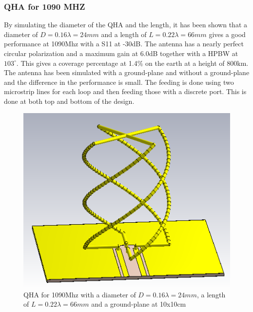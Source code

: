 \subsubsection{QHA for 1090 MHZ}
By simulating the diameter of the QHA and the length, it has been shown that a diameter of $D=0.16\lambda = 24mm$ and a length of $L=0.22\lambda = 66mm$ gives a good performance at 1090Mhz with a S11 at -30dB. The antenna has a nearly perfect circular polarization and a maximum gain at 6.0dB together with a HPBW at $103^\circ$. This gives a coverage percentage at 1.4\% on the earth at a height of 800km. The antenna has been simulated with a ground-plane and without a ground-plane and the difference in the performance is small. The feeding is done using two microstrip lines for each loop and then feeding those with a discrete port. This is done at both top and bottom of the design.   

\begin{figure}[H]
\centering 
\includegraphics[scale = 0.8]{figures/antennas/qha/1090mhz}
\caption{QHA for 1090Mhz with a diameter of $D=0.16\lambda = 24mm$, a length of $L=0.22\lambda = 66mm$ and a ground-plane at 10x10cm}
\label{fig:QHA_1090}
\end{figure}

